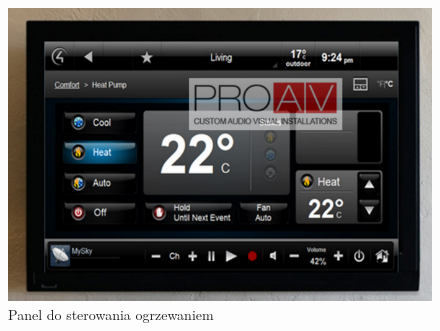 \begin{figure}[!htbp]
	\centering
	\includegraphics[width=1.0\textwidth]{images/panel_ogrzewanie.png}
	\caption[Panel do sterowania ogrzewaniem.]{Panel do sterowania ogrzewaniem}
	\label{fig:panel_ogrzewanie}
\end{figure}

